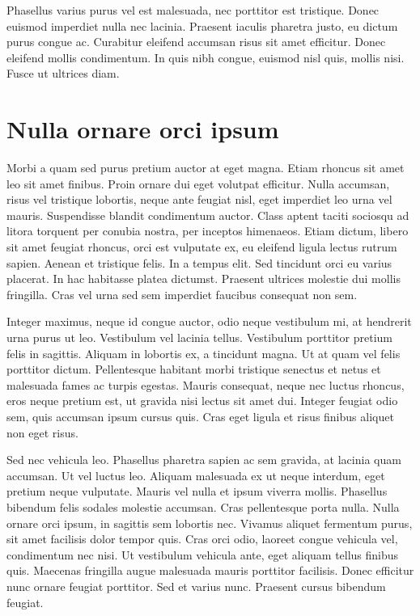 Phasellus varius purus vel est malesuada, nec porttitor est tristique. Donec euismod imperdiet nulla nec lacinia. Praesent iaculis pharetra justo, eu dictum purus congue ac. Curabitur eleifend accumsan risus sit amet efficitur. Donec eleifend mollis condimentum. In quis nibh congue, euismod nisl quis, mollis nisi. Fusce ut ultrices diam.

\section{Nulla ornare orci ipsum}
Morbi a quam sed purus pretium auctor at eget magna. Etiam rhoncus sit amet leo sit amet finibus. Proin ornare dui eget volutpat efficitur. Nulla accumsan, risus vel tristique lobortis, neque ante feugiat nisl, eget imperdiet leo urna vel mauris. Suspendisse blandit condimentum auctor. Class aptent taciti sociosqu ad litora torquent per conubia nostra, per inceptos himenaeos. Etiam dictum, libero sit amet feugiat rhoncus, orci est vulputate ex, eu eleifend ligula lectus rutrum sapien. Aenean et tristique felis. In a tempus elit. Sed tincidunt orci eu varius placerat. In hac habitasse platea dictumst. Praesent ultrices molestie dui mollis fringilla. Cras vel urna sed sem imperdiet faucibus consequat non sem.

Integer maximus, neque id congue auctor, odio neque vestibulum mi, at hendrerit urna purus ut leo. Vestibulum vel lacinia tellus. Vestibulum porttitor pretium felis in sagittis. Aliquam in lobortis ex, a tincidunt magna. Ut at quam vel felis porttitor dictum. Pellentesque habitant morbi tristique senectus et netus et malesuada fames ac turpis egestas. Mauris consequat, neque nec luctus rhoncus, eros neque pretium est, ut gravida nisi lectus sit amet dui. Integer feugiat odio sem, quis accumsan ipsum cursus quis. Cras eget ligula et risus finibus aliquet non eget risus.

Sed nec vehicula leo. Phasellus pharetra sapien ac sem gravida, at lacinia quam accumsan. Ut vel luctus leo. Aliquam malesuada ex ut neque interdum, eget pretium neque vulputate. Mauris vel nulla et ipsum viverra mollis. Phasellus bibendum felis sodales molestie accumsan. Cras pellentesque porta nulla. Nulla ornare orci ipsum, in sagittis sem lobortis nec. Vivamus aliquet fermentum purus, sit amet facilisis dolor tempor quis. Cras orci odio, laoreet congue vehicula vel, condimentum nec nisi. Ut vestibulum vehicula ante, eget aliquam tellus finibus quis. Maecenas fringilla augue malesuada mauris porttitor facilisis. Donec efficitur nunc ornare feugiat porttitor. Sed et varius nunc. Praesent cursus bibendum feugiat.

